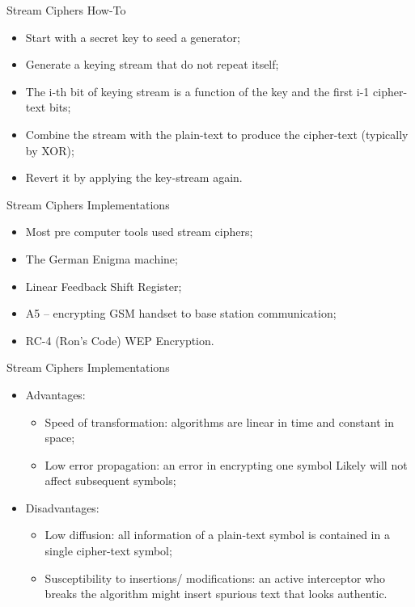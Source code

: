 \documentclass[12pt,table,xcolor={dvipsnames}]{beamer}
\begin{document}
\begin{frame}{Stream Ciphers How-To}
\begin{itemize}
\item Start with a secret key to seed a generator;\pause
\item Generate a keying stream that do not repeat itself;\pause
\item The i-th bit of keying stream is a function of the key and the first i-1 cipher-text bits;\pause
\item Combine the stream with the plain-text to produce the cipher-text (typically by XOR);\pause
\item Revert it by applying the key-stream again.
\end{itemize}
\end{frame}

\begin{frame}{Stream Ciphers Implementations}
\begin{itemize}
\item Most pre computer tools used stream ciphers;\pause
\item The German Enigma machine;\pause
\item Linear Feedback Shift Register;\pause
\item A5 – encrypting GSM handset to base station communication;\pause
\item RC-4 (Ron’s Code) WEP Encryption.
\end{itemize}
\end{frame}

\begin{frame}{Stream Ciphers Implementations}
\begin{itemize}
\item Advantages:\pause
\begin{itemize}
\item Speed of transformation: algorithms are linear in time and constant in space;\pause
\item Low error propagation: an error in encrypting one symbol Likely will not affect subsequent symbols;\pause
\end{itemize}
\item Disadvantages:\pause
\begin{itemize}
\item Low diffusion: all information of a plain-text symbol is contained in a single cipher-text symbol;\pause
\item Susceptibility to insertions/ modifications: an active interceptor who breaks the algorithm might insert spurious text that looks authentic.
\end{itemize}
\end{itemize}
\end{frame}
\end{document}
